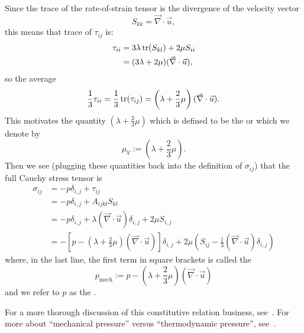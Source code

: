 \begin{remark}
Since the trace of the rate-of-strain tensor is the divergence of the
velocity vector
\begin{equation}
S_{kk}=\vec{\nabla}\cdot\vec{u},
\end{equation}
this means that trace of $\tau_{ij}$ is:
\begin{subequations}
  \begin{align}
\tau_{ii} &= 3\lambda\operatorname{tr}(S_{kl})+2\mu S_{ii}\\
&=(3\lambda+2\mu)(\vec{\nabla}\cdot\vec{u}),
  \end{align}
\end{subequations}
so the average
\begin{equation}
\frac{1}{3}\tau_{ii}=\frac{1}{3}\operatorname{tr}(\tau_{ij})=\left(\lambda+\frac{2}{3}\mu\right)(\vec{\nabla}\cdot\vec{u}).
\end{equation}
This motivates the quantity $(\lambda+\frac{2}{3}\mu)$ which is
defined to be the  or 
which we denote by
\begin{equation}
\mu_{V} := \left(\lambda+\frac{2}{3}\mu\right).
\end{equation}
Then we see (plugging these quantities back into the definition of
$\sigma_{ij}$) that the full Cauchy stress tensor is
\begin{subequations}
  \begin{align}
\sigma_{ij} &= -p\delta_{i,j}+\tau_{ij}\\
&=-p\delta_{i,j}+A_{ijkl}S_{kl}\\
&=-p\delta_{i,j}+\lambda(\vec{\nabla}\cdot\vec{u})\delta_{i,j}+2\mu S_{i,j}\\
&=-\left[p -\left(\lambda+\frac{2}{3}\mu\right)(\vec{\nabla}\cdot\vec{u})\right]\delta_{i,j}+2\mu\left(S_{ij}-\frac{1}{3}(\vec{\nabla}\cdot\vec{u})\delta_{i,j}\right)
  \end{align}
\end{subequations}
where, in the last line, the first term in square brackets is called
the 
\begin{equation}
p_{\text{mech}} := p -\left(\lambda+\frac{2}{3}\mu\right)(\vec{\nabla}\cdot\vec{u})
\end{equation}
and we refer to $p$ as the .
\end{remark}

\begin{remark}
For a more thorough discussion of this constitutive relation business, see~\cite[\S3.3]{batchelor1973introduction}.
For more about ``mechanical pressure'' versus ``thermodynamic
pressure'', see~\cite[\S2-4.3]{white1991viscous}.
\end{remark}

